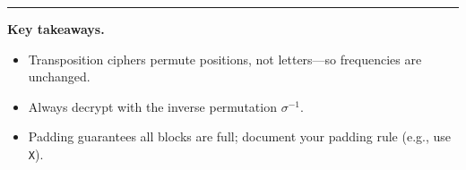 \documentclass[12pt]{article}
\begin{document}
\bigskip
\hrule
\bigskip

\textbf{Key takeaways.}
\begin{itemize}
  \item Transposition ciphers permute positions, not letters—so frequencies are unchanged.
  \item Always decrypt with the inverse permutation \(\sigma^{-1}\).
  \item Padding guarantees all blocks are full; document your padding rule (e.g., use \texttt{X}).
\end{itemize}
\end{document}
